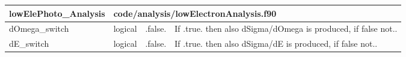 \documentclass{article}
\begin{document}

\begin{longtable}{llll}
\toprule
\textbf{\large{lowElePhoto\_Analysis}} & \multicolumn{3}{l}{\footnotesize{code/analysis/lowElectronAnalysis.f90}}\\*
\midrule
\endfirsthead
\midrule
\endhead
dOmega\_switch & \begin{minipage}[t]{2cm}logical\end{minipage} & \begin{minipage}[t]{2cm}.false.\end{minipage} & \begin{minipage}[t]{12cm}If .true. then also dSigma/dOmega is produced, if false not..\end{minipage}\\*
\midrule
dE\_switch & \begin{minipage}[t]{2cm}logical\end{minipage} & \begin{minipage}[t]{2cm}.false.\end{minipage} & \begin{minipage}[t]{12cm}If .true. then also dSigma/dE is produced, if false not..\end{minipage}\\*
\bottomrule
\end{longtable}
{ }



\end{document}
